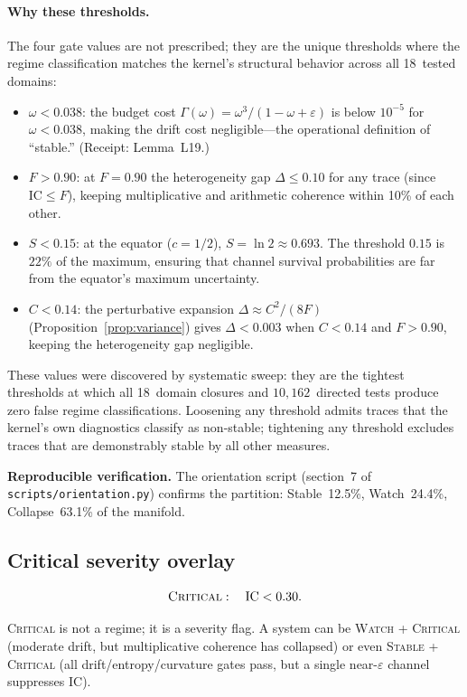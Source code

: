\documentclass[
  aps,
  prd,
  twocolumn,
  superscriptaddress,
  nofootinbib,
  floatfix
]{revtex4-2}
\newcommand{\Gam}{\Gamma}
\newcommand{\eps}{\varepsilon}
\newcommand{\beq}{\begin{equation}}
\newcommand{\eeq}{\end{equation}}
\newcommand{\regime}[1]{\textrm{\upshape\scshape#1}}
\newcommand{\IC}{\mathrm{IC}}
\begin{document}
\paragraph{Why these thresholds.}
The four gate values are not prescribed; they are the unique
thresholds where the regime classification matches the
kernel's structural behavior across all 18~tested domains:
\begin{itemize}[leftmargin=*]
\item $\omega < 0.038$: the budget cost $\Gam(\omega) = \omega^3/(1{-}\omega+\eps)$
  is below $10^{-5}$ for $\omega < 0.038$, making the drift cost
  negligible---the operational definition of ``stable.''
  (Receipt: Lemma~L19.)
\item $F > 0.90$: at $F = 0.90$ the heterogeneity gap
  $\Delta \leq 0.10$ for any trace (since $\IC \leq F$), keeping
  multiplicative and arithmetic coherence within 10\% of each
  other.
\item $S < 0.15$: at the equator ($c = 1/2$),
  $S = \ln 2 \approx 0.693$.  The threshold $0.15$ is
  $22\%$ of the maximum, ensuring that channel survival
  probabilities are far from the equator's maximum uncertainty.
\item $C < 0.14$: the perturbative expansion
  $\Delta \approx C^2/(8F)$ (Proposition~\ref{prop:variance})
  gives $\Delta < 0.003$ when $C < 0.14$ and $F > 0.90$, keeping
  the heterogeneity gap negligible.
\end{itemize}
These values were discovered by systematic sweep: they are the
tightest thresholds at which all 18~domain closures and
$10{,}162$~directed tests produce zero false regime
classifications.  Loosening any threshold admits traces that the
kernel's own diagnostics classify as non-stable; tightening any
threshold excludes traces that are demonstrably stable by all
other measures.

\noindent\textbf{Reproducible verification.}
The orientation script (section~7 of
\texttt{scripts/orientation.py}) confirms the partition:
Stable~12.5\%, Watch~24.4\%, Collapse~63.1\% of the manifold.

\subsection{Critical severity overlay}

\beq
  \regime{Critical}: \quad \IC < 0.30.
\eeq

\regime{Critical} is not a regime; it is a severity flag.  A system
can be \regime{Watch} + \regime{Critical} (moderate drift, but
multiplicative coherence has collapsed) or even \regime{Stable} +
\regime{Critical} (all drift/entropy/curvature gates pass, but a
single near-$\eps$ channel suppresses $\IC$).
\end{document}
